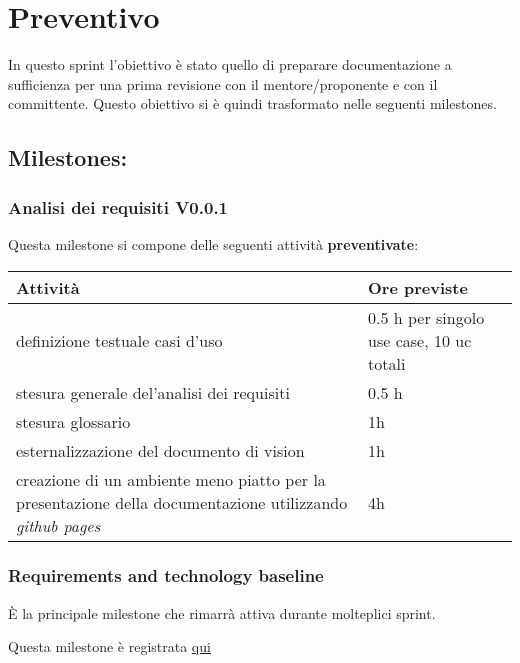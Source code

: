 \section{Preventivo}

In questo sprint l'obiettivo è stato quello di preparare documentazione a sufficienza per una prima revisione con il mentore/proponente e con il committente. Questo obiettivo si è quindi trasformato nelle seguenti milestones.

\subsection{Milestones:}

\subsubsection{Analisi dei requisiti V0.0.1}

Questa milestone si compone delle seguenti attività \textbf{preventivate}:

\begin{center}
    \begin{tabularx}{\textwidth}{X l}
        
        \rowcolor{gray!30} \textbf{Attività} & \textbf{Ore previste}\\
        
        \hline

        definizione testuale casi d'uso  & 0.5 h per singolo use case, 10 uc totali \\
        \rowcolor{gray!10}stesura generale del'analisi dei requisiti & 0.5 h \\
        stesura glossario& 1h\\
        \rowcolor{gray!10}esternalizzazione del documento di vision& 1h\\
        creazione di un ambiente meno piatto per la presentazione della documentazione utilizzando \textit{github pages}& 4h\\
    \end{tabularx}
\end{center}

\subsubsection{Requirements and technology baseline}

È la principale milestone che rimarrà attiva durante molteplici sprint.

Questa milestone è registrata \href{https://github.com/SWEasabi/documentazione/milestone/2}{qui}
